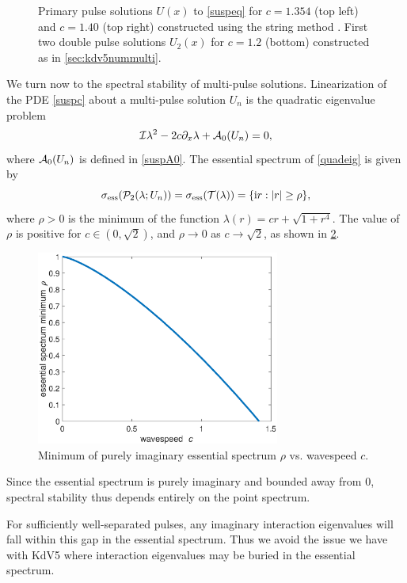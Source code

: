 \documentclass[thesis.tex]{subfiles}
\begin{document}
\begin{figure}
\begin{tabular}{cc}
\end{tabular}
\caption[Primary pulse solutions to Chen-McKenna]{Primary pulse solutions $U(x)$ to \cref{suspeq} for $c = 1.354$ (top left) and $c = 1.40$ (top right) constructed using the string method \cite{Chamard2011}. First two double pulse solutions $U_2(x)$ for $c = 1.2$ (bottom) constructed as in \cref{sec:kdv5nummulti}.}
\label{fig:chen1}
\end{figure}

We turn now to the spectral stability of multi-pulse solutions. Linearization of the PDE \cref{suspc} about a multi-pulse solution $U_n$ is the quadratic eigenvalue problem
\begin{equation}\label{quadeig}
\mathcal{I} \lambda^2 - 2 c \partial_x \lambda + \mathcal{A}_0(U_n) = 0,
\end{equation}
where $\mathcal{A}_0(U_n)$ is defined in \cref{suspA0}. The essential spectrum of \cref{quadeig} is given by
\begin{equation}\label{quadess}
\sigma_{\mathrm{ess}}(\mathcal{P}_2(\lambda; U_n)) = \sigma_{\mathrm{ess}}(\mathcal{T}(\lambda)) = \{\mathrm{i} r : |r| \geq \rho \},
\end{equation}
where $\rho > 0$ is the minimum of the function $\lambda(r) = c r + \sqrt{1 + r^4}$. The value of $\rho$ is positive for $c \in (0, \sqrt{2})$, and $\rho\to 0$ as $c\to\sqrt{2}$, as shown in \cref{fig:essspecrho}.
\begin{figure}
\centering
\includegraphics[width=8cm]{images/other/essspecrho.eps}
\caption[Essential spectrum bound for Chen-McKenna]{Minimum of purely imaginary essential spectrum $\rho$ vs. wavespeed $c$.}
\label{fig:essspecrho}
\end{figure}
Since the essential spectrum is purely imaginary and bounded away from 0, spectral stability thus depends entirely on the point spectrum.

For sufficiently well-separated pulses, any imaginary interaction eigenvalues will fall within this gap in the essential spectrum. Thus we avoid the issue we have with KdV5 where interaction eigenvalues may be buried in the essential spectrum. 
\end{document}

